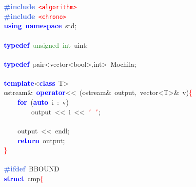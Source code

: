 \mbox{}\textbf{\textcolor{RoyalBlue}{\#include}}\ \texttt{\textcolor{Red}{\textless{}algorithm\textgreater{}}} \\
\mbox{}\textbf{\textcolor{RoyalBlue}{\#include}}\ \texttt{\textcolor{Red}{\textless{}chrono\textgreater{}}} \\
\mbox{}\textbf{\textcolor{Blue}{using}}\ \textbf{\textcolor{Blue}{namespace}}\ std\textcolor{BrickRed}{;} \\
\mbox{} \\
\mbox{}\textbf{\textcolor{Blue}{typedef}}\ \textcolor{ForestGreen}{unsigned}\ \textcolor{ForestGreen}{int}\ uint\textcolor{BrickRed}{;} \\
\mbox{} \\
\mbox{}\textbf{\textcolor{Blue}{typedef}}\ \textcolor{TealBlue}{pair\textless{}vector\textless{}bool\textgreater{},int\textgreater{}}\ Mochila\textcolor{BrickRed}{;} \\
\mbox{} \\
\mbox{}\textbf{\textcolor{Blue}{template}}\textcolor{BrickRed}{\textless{}}\textbf{\textcolor{Blue}{class}}\ \textcolor{TealBlue}{T}\textcolor{BrickRed}{\textgreater{}} \\
\mbox{}ostream\textcolor{BrickRed}{\&}\ \textbf{\textcolor{Blue}{operator}}\textcolor{BrickRed}{\textless{}\textless{}}\ \textcolor{BrickRed}{(}ostream\textcolor{BrickRed}{\&}\ output\textcolor{BrickRed}{,}\ vector\textcolor{BrickRed}{\textless{}}T\textcolor{BrickRed}{\textgreater{}\&}\ v\textcolor{BrickRed}{)}\textcolor{Red}{\{} \\
\mbox{}\ \ \ \ \textbf{\textcolor{Blue}{for}}\ \textcolor{BrickRed}{(}\textbf{\textcolor{Blue}{auto}}\ i\ \textcolor{BrickRed}{:}\ v\textcolor{BrickRed}{)} \\
\mbox{}\ \ \ \ \ \ \ \ output\ \textcolor{BrickRed}{\textless{}\textless{}}\ i\ \textcolor{BrickRed}{\textless{}\textless{}}\ \texttt{\textcolor{Red}{'\ '}}\textcolor{BrickRed}{;} \\
\mbox{} \\
\mbox{}\ \ \ \ output\ \textcolor{BrickRed}{\textless{}\textless{}}\ endl\textcolor{BrickRed}{;} \\
\mbox{}\ \ \ \ \textbf{\textcolor{Blue}{return}}\ output\textcolor{BrickRed}{;} \\
\mbox{}\textcolor{Red}{\}} \\
\mbox{} \\
\mbox{}\textbf{\textcolor{RoyalBlue}{\#ifdef}}\ BBOUND \\
\mbox{}\textbf{\textcolor{Blue}{struct}}\ \textcolor{TealBlue}{cmp}\textcolor{Red}{\{} \\
